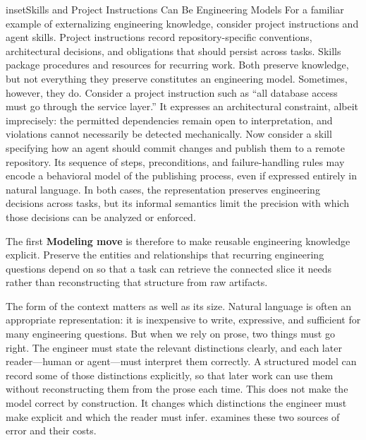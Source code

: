 \begin{bookbox}{inset}{Skills and Project Instructions Can Be Engineering Models}
\label{inset-skills-and-project-instructions}
For a familiar example of externalizing engineering knowledge, consider project instructions and agent skills. Project instructions record repository-specific conventions, architectural decisions, and obligations that should persist across tasks. Skills package procedures and resources for recurring work. Both preserve knowledge, but not everything they preserve constitutes an engineering model. Sometimes, however, they do. Consider a project instruction such as ``all database access must go through the service layer.'' It expresses an architectural constraint, albeit imprecisely: the permitted dependencies remain open to interpretation, and violations cannot necessarily be detected mechanically. Now consider a skill specifying how an agent should commit changes and publish them to a remote repository. Its sequence of steps, preconditions, and failure-handling rules may encode a behavioral model of the publishing process, even if expressed entirely in natural language. In both cases, the representation preserves engineering decisions across tasks, but its informal semantics limit the precision with which those decisions can be analyzed or enforced.
\end{bookbox}


The first \textbf{Modeling move} is therefore to make reusable engineering knowledge explicit. Preserve the entities and relationships that recurring engineering questions depend on so that a task can retrieve the connected slice it needs rather than reconstructing that structure from raw artifacts.


The form of the context matters as well as its size. Natural language is often an appropriate representation: it is inexpensive to write, expressive, and sufficient for many engineering questions. But when we rely on prose, two things must go right. The engineer must state the relevant distinctions clearly, and each later reader---human or agent---must interpret them correctly. A structured model can record some of those distinctions explicitly, so that later work can use them without reconstructing them from the prose each time. This does not make the model correct by construction. It changes which distinctions the engineer must make explicit and which the reader must infer.  examines these two sources of error and their costs.


